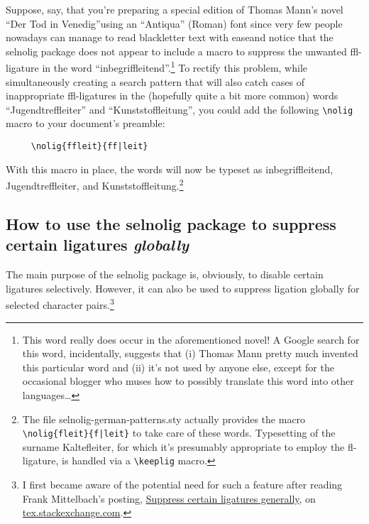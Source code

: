 \documentclass[12pt]{article}
\newcommand{\pkg}[1]{\textsf{#1}}
\newcommand{\cmmd}[1]{\texttt{\textbackslash #1}}
\begin{document}
Suppose, say, that you're preparing a special edition of Thomas Mann's novel \enquote{Der Tod in Venedig}\textemdash using an \enquote{Antiqua} (Roman) font since very few people nowadays can manage to read {\blackletterfont blackletter} text with ease\textemdash and notice that the \pkg{selnolig} package does not appear to include a macro to suppress the unwanted ffl-ligature in the word \enquote{inbegri\mbox{ffl}eitend}.\footnote{This word really does occur in the aforementioned novel! A Google search for this word, incidentally, suggests that (i) Thomas Mann pretty much invented this particular word and (ii) it's not used by anyone else, except for the occasional blogger who muses how to possibly translate this word into other languages\ldots} To rectify this problem, while simultaneously creating a search pattern that will also catch cases of inappropriate ffl-ligatures in the (hopefully quite a bit more common) words  \enquote{Jugendtre\mbox{ffl}eiter} and \enquote{Kunststo\mbox{ffl}eitung}, you could add the following \Verb+\nolig+ macro to your document's preamble:
\begin{Verbatim}
     \nolig{ffleit}{ff|leit}
\end{Verbatim}
With this macro in place, the words will now be typeset as inbegriffleitend, Jugendtreffleiter, and Kunststoffleitung.\footnote{The file \pkg{selnolig-german-patterns.sty} actually provides the macro \Verb+\nolig{fleit}{f|leit}+ to take care of these words. Typesetting of the surname Kaltefleiter, for which it's presumably appropriate to employ the fl-ligature, is handled via a \cmmd{keeplig} macro.}



\subsection[How to use the selnolig package to suppress certain ligatures globally]{How to use the selnolig package to suppress certain ligatures \emph{globally}}
\label{sec:global-nolig}


The main purpose of the \pkg{selnolig} package is, obviously, to disable certain ligatures selectively. However, it can also be used to suppress ligation globally for selected character pairs.\footnote{I first became aware of the potential need for such a feature after reading Frank Mittelbach's posting, \href{http://tex.stackexchange.com/q/61042/5001}{Suppress certain ligatures generally}, on \url{tex.stackexchange.com}.}

\bgroup \ebg
\end{document}
